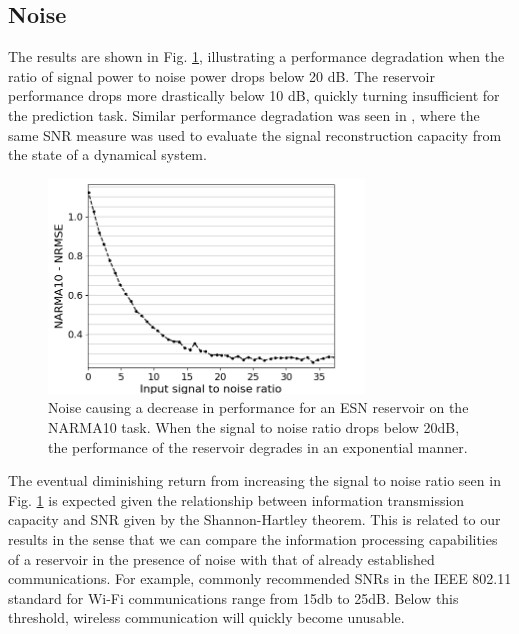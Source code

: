 \subsection{Noise}


The results are shown in Fig. \ref{input_noise_snr}, illustrating a performance
degradation when the ratio of signal power to noise power drops below 20 dB. The
reservoir performance drops more drastically below 10 dB, quickly turning
insufficient for the prediction task. Similar performance degradation was seen
in \cite{dambre_information_2012}, where the same SNR measure was used to
evaluate the signal reconstruction capacity from the state of a dynamical
system.

\begin{figure}
  \centering
  \includegraphics[width=3.3in]{img/input_noise_snr.png}
  \caption{
    Noise causing a decrease in performance for an ESN reservoir on the NARMA10
task. When the signal to noise ratio drops below 20dB, the performance of the
reservoir degrades in an exponential manner.
  }
  \label{input_noise_snr}
\end{figure}

The eventual diminishing return from increasing the signal to noise ratio seen
in Fig. \ref{input_noise_snr} is expected given the relationship between
information transmission capacity and SNR given by the Shannon-Hartley
theorem. This is related to our results in the sense that we can compare the
information processing capabilities of a reservoir in the presence of noise with
that of already established communications. For example, commonly recommended
SNRs in the IEEE 802.11 standard for Wi-Fi communications range from 15db to
25dB. Below this threshold, wireless communication will quickly become unusable.

